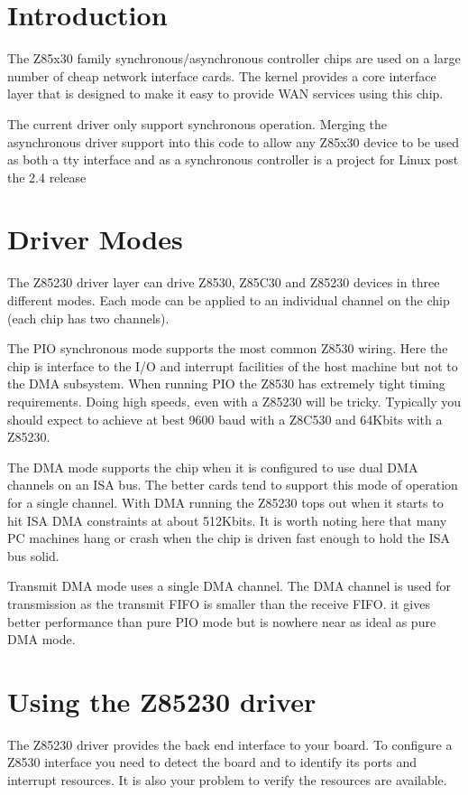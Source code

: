 \documentclass[a4paper,8pt,english]{sphinxmanual}
\begin{document}
\section{Introduction}
\label{networking/z8530book:introduction}
The Z85x30 family synchronous/asynchronous controller chips are used on
a large number of cheap network interface cards. The kernel provides a
core interface layer that is designed to make it easy to provide WAN
services using this chip.

The current driver only support synchronous operation. Merging the
asynchronous driver support into this code to allow any Z85x30 device to
be used as both a tty interface and as a synchronous controller is a
project for Linux post the 2.4 release


\section{Driver Modes}
\label{networking/z8530book:driver-modes}
The Z85230 driver layer can drive Z8530, Z85C30 and Z85230 devices in
three different modes. Each mode can be applied to an individual channel
on the chip (each chip has two channels).

The PIO synchronous mode supports the most common Z8530 wiring. Here the
chip is interface to the I/O and interrupt facilities of the host
machine but not to the DMA subsystem. When running PIO the Z8530 has
extremely tight timing requirements. Doing high speeds, even with a
Z85230 will be tricky. Typically you should expect to achieve at best
9600 baud with a Z8C530 and 64Kbits with a Z85230.

The DMA mode supports the chip when it is configured to use dual DMA
channels on an ISA bus. The better cards tend to support this mode of
operation for a single channel. With DMA running the Z85230 tops out
when it starts to hit ISA DMA constraints at about 512Kbits. It is worth
noting here that many PC machines hang or crash when the chip is driven
fast enough to hold the ISA bus solid.

Transmit DMA mode uses a single DMA channel. The DMA channel is used for
transmission as the transmit FIFO is smaller than the receive FIFO. it
gives better performance than pure PIO mode but is nowhere near as ideal
as pure DMA mode.


\section{Using the Z85230 driver}
\label{networking/z8530book:using-the-z85230-driver}
The Z85230 driver provides the back end interface to your board. To
configure a Z8530 interface you need to detect the board and to identify
its ports and interrupt resources. It is also your problem to verify the
resources are available.
\end{document}
